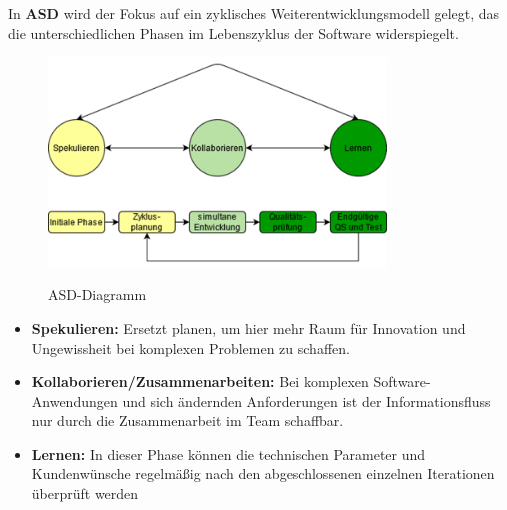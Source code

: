 In \textbf{ASD} wird der Fokus auf ein zyklisches Weiterentwicklungsmodell gelegt, das die unterschiedlichen Phasen im Lebenszyklus
der Software widerspiegelt. \cite{Abdelaziz2015-lb}
\begin{figure}[h!]
\centering
\caption{ASD-Diagramm}
    \includegraphics[width=0.8\textwidth]{fig/ASD.png}
    \label{fig:ASD-diagram}
\end{figure}
\begin{itemize}
    \item \textbf{Spekulieren:} Ersetzt planen, um hier mehr Raum für Innovation und Ungewissheit bei komplexen Problemen zu schaffen.
    \item \textbf{Kollaborieren/Zusammenarbeiten:} Bei komplexen Software-Anwendungen und sich ändernden Anforderungen ist der Informationsfluss nur durch die Zusammenarbeit im Team schaffbar.
    \item \textbf{Lernen:} In dieser Phase können die technischen Parameter und Kundenwünsche regelmäßig nach den abgeschlossenen einzelnen Iterationen überprüft werden
\end{itemize}
\cite{Alnoukari2008-ro,Abdelaziz2015-lb} \\

